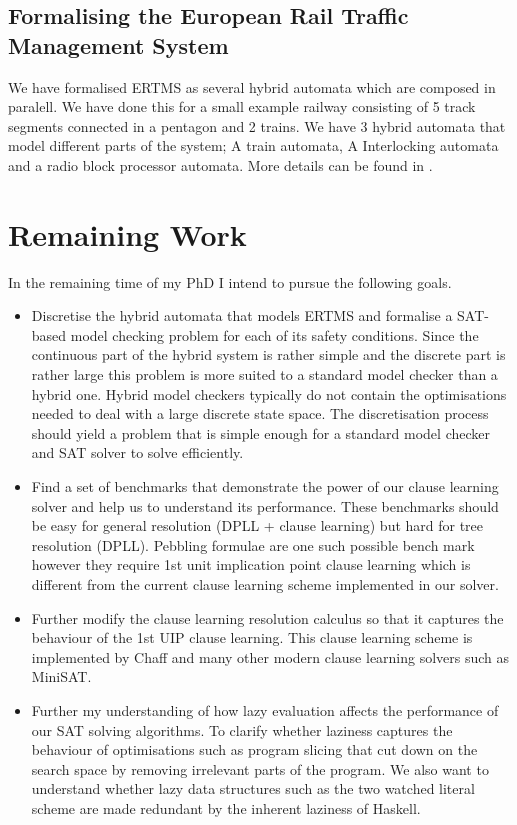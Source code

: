 \documentclass{article}
\begin{document}
\subsection*{Formalising the European Rail Traffic Management System}
We have formalised ERTMS as several hybrid automata which are composed in paralell. We have done this for a small example railway consisting of 5 track segments connected in a pentagon and 2 trains. We have 3 hybrid automata that model different parts of the system; A train automata, A Interlocking automata and a radio block processor automata. More details can be found in \cite{AL13b}. 



\section{Remaining Work}
In the remaining time of my PhD I intend to pursue the following goals.
\begin{itemize}

\item Discretise the hybrid automata that models ERTMS and formalise a SAT-based model checking problem for each of its safety conditions. Since the continuous part of the hybrid system is rather simple and the discrete part is rather large this problem is more suited to a standard model checker than a hybrid one. Hybrid model checkers typically do not contain the optimisations needed to deal with a large discrete state space.  The discretisation process should yield a problem that is simple enough for a standard model checker and SAT solver to solve efficiently.

\item Find a set of benchmarks that demonstrate the power of our clause learning solver and help us to understand its performance. These benchmarks should be easy for general resolution (DPLL + clause learning) but hard for tree resolution (DPLL). Pebbling formulae are one such possible bench mark however they require 1st unit implication point clause learning which is different from the current clause learning scheme implemented in our solver.

\item Further modify the clause learning resolution calculus so that it captures the behaviour of the 1st UIP clause learning. This clause learning scheme is implemented by Chaff and many other modern clause learning solvers such as MiniSAT.

\item Further my understanding of how lazy evaluation affects the performance of our SAT solving algorithms. To clarify whether laziness captures the behaviour of optimisations such as program slicing that cut down on the search space by removing irrelevant parts of the program. We also want to understand whether lazy data structures such as the two watched literal scheme are made redundant by the inherent laziness of Haskell. 

\end{itemize}





\end{document}
